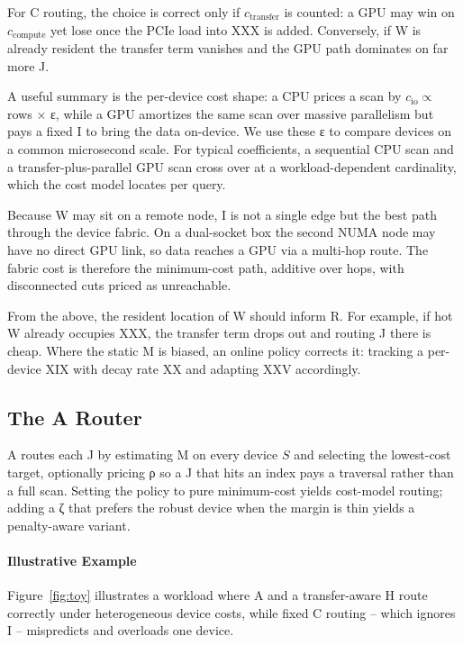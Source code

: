 \documentclass{article}
\begin{document}
For C routing, the choice is correct only if $c_{\text{transfer}}$ is counted:
a GPU may win on $c_{\text{compute}}$ yet lose once the PCIe load into XXX is
added. Conversely, if W is already resident the transfer term vanishes and the
GPU path dominates on far more J.

A useful summary is the per-device cost shape: a CPU prices a scan by
$c_{\text{io}} \propto$ rows $\times$ ε, while a GPU amortizes the same
scan over massive parallelism but pays a fixed I to bring the data on-device.
We use these ε to compare devices on a common microsecond scale. For
typical coefficients, a sequential CPU scan and a transfer-plus-parallel GPU
scan cross over at a workload-dependent cardinality, which the cost model
locates per query.

Because W may sit on a remote node, I is not a single edge but the best path
through the device fabric. On a dual-socket box the second NUMA node may have no
direct GPU link, so data reaches a GPU via a multi-hop route. The fabric cost is
therefore the minimum-cost path, additive over hops, with disconnected cuts
priced as unreachable.

From the above, the resident location of W should inform R. For example, if hot
W already occupies XXX, the transfer term drops out and routing J there is
cheap. Where the static M is biased, an online policy corrects it: tracking a
per-device XIX with decay rate XX and adapting XXV accordingly.

\subsection{The A Router}
\label{sec:lynceus_router}

A routes each J by estimating M on every device $S$ and selecting the
lowest-cost target, optionally pricing ρ so a J that hits an index pays a
traversal rather than a full scan. Setting the policy to pure minimum-cost
yields cost-model routing; adding a ζ that prefers the robust device when the
margin is thin yields a penalty-aware variant.

\paragraph{Illustrative Example} Figure~\ref{fig:toy} illustrates a workload
where A and a transfer-aware H route correctly under heterogeneous device costs,
while fixed C routing -- which ignores I -- mispredicts and overloads one device.
\end{document}
